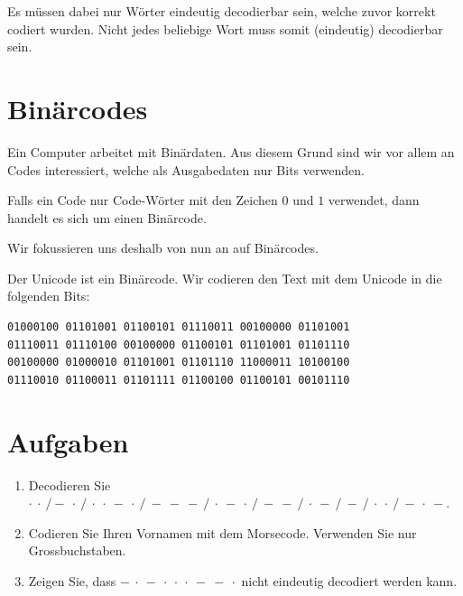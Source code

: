 Es müssen dabei nur Wörter eindeutig decodierbar sein, welche zuvor korrekt codiert wurden. Nicht jedes beliebige Wort muss somit (eindeutig) decodierbar sein.

\section{Binärcodes}

Ein Computer arbeitet mit Binärdaten. Aus diesem Grund sind wir vor allem an Codes interessiert, welche als Ausgabedaten nur Bits verwenden.

\begin{definition}[Binärcode]
Falls ein Code nur Code-Wörter mit den Zeichen $0$ und $1$ verwendet, dann handelt es sich um einen Binärcode.
\end{definition}

Wir fokussieren uns deshalb von nun an auf Binärcodes.

\begin{example}
Der Unicode ist ein Binärcode. Wir codieren den Text  mit dem Unicode in die folgenden Bits:

\begin{lstlisting}[language=output, caption={Leerzeichen und neue Zeilen dienen nur der Übersicht.}]
01000100 01101001 01100101 01110011 00100000 01101001
01110011 01110100 00100000 01100101 01101001 01101110
00100000 01000010 01101001 01101110 11000011 10100100
01110010 01100011 01101111 01100100 01100101 00101110
\end{lstlisting}

\end{example}

\section{Aufgaben}

\begin{enumerate}
\item Decodieren Sie $\cdot~\cdot~/-~\cdot~/~\cdot~\cdot~-~\cdot~/~-~-~-~/~\cdot~-~\cdot~/~-~-~/~\cdot~-~/~-~/~\cdot~\cdot~/~-~\cdot~-$.
\fillwithgrid{0.5in}
\item Codieren Sie Ihren Vornamen mit dem Morsecode. Verwenden Sie nur Grossbuchstaben.
\fillwithgrid{0.5in}
\item Zeigen Sie, dass $-~\cdot~-~\cdot~\cdot~\cdot~-~-~\cdot$ nicht eindeutig decodiert werden kann.
\fillwithgrid{0.75in}
\end{enumerate}